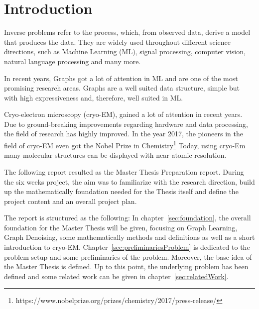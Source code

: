 \chapter{Introduction}
\label{sec:introduction}

Inverse problems refer to the process, which, from observed data, derive a model that produces
the data. They are widely used throughout different science directions, such as Machine Learning (ML),
signal processing, computer vision, natural language processing and many more.

In recent years, Graphs got a lot of attention in ML and are one of the most promising research areas.
Graphs are a well suited data structure, simple but with high expressiveness 
and, therefore, well suited in ML.

Cryo-electron microscopy (cryo-EM), gained a lot of attention in recent years. 
Due to ground-breaking improvements regarding hardware and data processing, the field of research
has highly improved. In the year 2017, the pioneers in the field of cryo-EM even got the 
Nobel Prize in Chemistry\footnote{https://www.nobelprize.org/prizes/chemistry/2017/press-release/}
Today, using cryo-Em many molecular structures can be displayed with near-atomic resolution.

\bigskip

The following report resulted as the Master Thesis Preparation report. During the six weeks project, 
the aim was to familiarize with the research direction, build up the mathematically foundation needed 
for the Thesis itself and define the project content and an overall project plan.

\bigskip

The report is structured as the following:
In chapter~\ref{sec:foundation}, the overall foundation for the Master Thesis will be given, focusing 
on Graph Learning, Graph Denoising, some mathematically methods and definitions as well as
 a short introduction to cryo-EM.
Chapter~\ref{sec:preliminariesProblem} is dedicated to the problem setup and some preliminaries of the problem. 
Moreover, the base idea of the Master Thesis is defined.
Up to this point, the underlying problem has been defined and some related work can be given in chapter~\ref{sec:relatedWork}.




